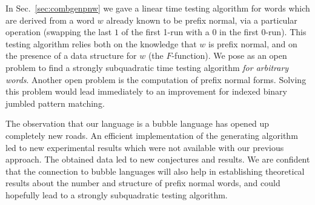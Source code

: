 \documentclass[11pt,a4paper]{llncs}
\begin{document}
In Sec.~\ref{sec:combgenpnw} we gave a linear time testing algorithm for words which are derived from a word $w$ already known to be prefix normal, via a particular operation (swapping the last $1$ of the first 1-run with a $0$ in the first 0-run). This testing algorithm relies both on the knowledge that $w$ is prefix normal, and on the presence of a data structure for $w$ (the $F$-function). We pose as an open problem to find a strongly subquadratic time testing algorithm {\em for arbitrary words}. Another open problem is the computation of prefix normal forms. 
Solving this problem would lead immediately to an improvement for indexed binary jumbled pattern matching.


The observation that our language is a bubble language has opened up
completely new roads. An efficient implementation of the generating algorithm
led to new experimental results which were not available with our previous approach. The obtained
data led to new conjectures and results. We are confident that the connection
to bubble languages will also help in establishing theoretical results about
the number and structure of prefix normal words, and could hopefully lead to a strongly subquadratic testing algorithm.
\end{document}
